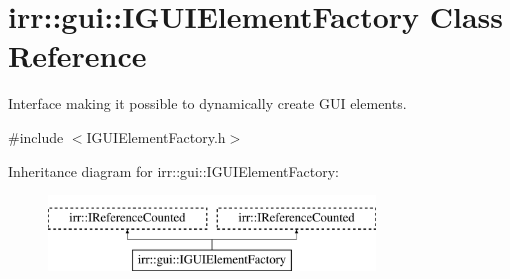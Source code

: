 \hypertarget{classirr_1_1gui_1_1IGUIElementFactory}{}\section{irr\+:\+:gui\+:\+:I\+G\+U\+I\+Element\+Factory Class Reference}
\label{classirr_1_1gui_1_1IGUIElementFactory}


Interface making it possible to dynamically create G\+UI elements.  




{\ttfamily \#include $<$I\+G\+U\+I\+Element\+Factory.\+h$>$}

Inheritance diagram for irr\+:\+:gui\+:\+:I\+G\+U\+I\+Element\+Factory\+:\begin{figure}[H]
\begin{center}
\leavevmode
\includegraphics[height=2.000000cm]{classirr_1_1gui_1_1IGUIElementFactory}
\end{center}
\end{figure}
